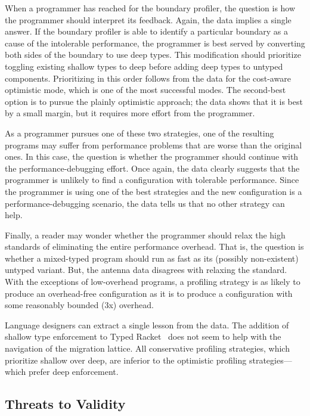 When a programmer has reached for the boundary profiler, the question is how the
programmer should interpret its feedback. Again, the data implies a single
answer.  If the boundary profiler is able to identify a particular boundary as a
cause of the intolerable performance, the programmer is best served by
converting both sides of the boundary to use deep types. This modification
should prioritize toggling existing shallow types to deep before adding deep
types to untyped components. Prioritizing in this order follows from the data
for the cost-aware optimistic mode, which is one of the most successful modes.
The second-best option is to pursue the
plainly optimistic approach; the data shows that it is best by a small margin,
but it requires more effort from the programmer. 

As a programmer pursues one of these two strategies, one of the resulting
programs may suffer from performance problems that are worse than the original
ones. In this case, the question is whether the programmer should continue with
the performance-debugging effort. Once again, the data clearly suggests that the
programmer is unlikely to find a configuration with tolerable performance. Since
the programmer is using one of the best strategies and the new
configuration is a performance-debugging scenario, the data tells us that no
other strategy can help.

Finally, a reader may wonder whether the programmer should relax the high
standards of eliminating the entire performance overhead.  That is, the question
is whether a mixed-typed program should run as fast as its (possibly
non-existent) untyped variant. But, the antenna data disagrees with relaxing the
standard. With the exceptions of low-overhead programs, a profiling strategy is
as likely to produce an overhead-free configuration as it is to produce a
configuration with some reasonably bounded ($3$x) overhead.

Language designers can extract a single lesson from the data.
The addition of shallow type enforcement to
Typed Racket~\cite{g-deep-shallow} does not seem to help with the navigation of the migration
lattice. All conservative profiling strategies, which prioritize shallow over
deep, are inferior to the optimistic profiling strategies---which prefer deep
enforcement. 

\subsection{Threats to Validity} \label{subsec:threats}

